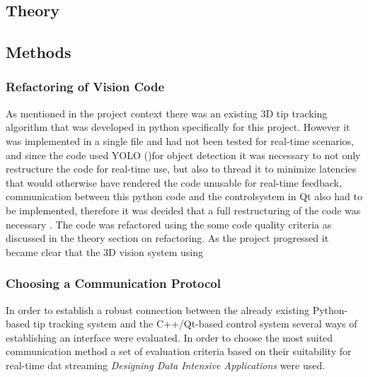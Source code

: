 
\subsection{Theory}


\subsection{Methods}

\subsubsection{Refactoring of Vision Code}
As mentioned in the project context there was an existing 3D tip tracking algorithm that was developed in python specifically for this project. However it was  implemented in a single file and had not been tested for real-time scenarios, and since the code used YOLO ()for object detection it was necessary to not only restructure the code for real-time use, but also to thread it to minimize latencies that would otherwise have rendered the code unusable for real-time feedback, communication between this python code and the controlsystem in Qt also had to be implemented, therefore it was decided that a full restructuring of the code was necessary
. The code was refactored using the some code quality criteria as discussed in the theory section on refactoring. 
\newline \newline
As the project progressed it became clear that the 3D vision system using 

\subsubsection{Choosing a Communication Protocol}
In order to establish a robust connection between the already existing Python-based tip tracking system and the C++/Qt-based control system several ways of establishing an interface were evaluated. In order to choose the most suited communication method a set of evaluation criteria based on their suitability for real-time dat streaming \textit{Designing Data Intensive Applications} \cite{kleppmann_designing_2017} were used.

